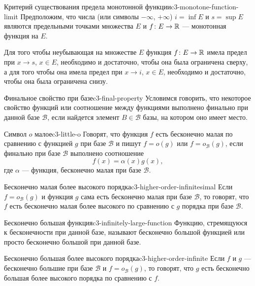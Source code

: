 \begin{theorem}{Критерий существования предела монотонной функции}{c3-monotone-function-limit}
  Предположим, что числа (или символы $-\infty$, $+\infty$)
  $i=\inf E$ и $s=\sup E$ являются предельными точками множества $E$ и
  $f\colon E\to\mathbb{R}$ — монотонная функция на $E$.

  Для того чтобы неубывающая на множестве $E$ функция $f\colon E\to\mathbb{R}$
  имела предел при $x\to s$, $x\in E$, необходимо и достаточно, чтобы она
  была ограничена сверху, а для того чтобы она имела предел при $x\to i$,
  $x\in E$, необходимо и достаточно, чтобы она была ограничена снизу.
\end{theorem}

\begin{definition}{Финальное свойство при базе}{c3-final-property}
  Условимся говорить, что некоторое свойство функций или соотношение между
  функциями выполнено финально при данной базе $\mathcal B$, если найдется
  элемент $B\in\mathcal B$ базы, на котором оно имеет место.
\end{definition}

\begin{definition}{Символ $o$ малое}{c3-little-o}
  Говорят, что функция $f$ есть бесконечно малая по сравнению с функцией
  $g$ при базе $\mathcal B$ и пишут $f=o(g)$ или
  $f=o_{\mathcal B}(g)$, если финально при базе $\mathcal B$ выполнено
  соотношение
  \[
    f(x)=\alpha(x)g(x),
  \]
  где $\alpha$ — функция, бесконечно малая при базе $\mathcal B$.
\end{definition}

\begin{definition}{Бесконечно малая более высокого порядка}{c3-higher-order-infinitesimal}
  Если $f=o_{\mathcal B}(g)$ и функция $g$ сама есть бесконечно малая при
  базе $\mathcal B$, то говорят, что $f$ есть бесконечно малая более высокого
  по сравнению с $g$ порядка при базе $\mathcal B$.
\end{definition}

\begin{definition}{Бесконечно большая функция}{c3-infinitely-large-function}
  Функцию, стремящуюся к бесконечности при данной базе, называют бесконечно
  большой функцией или просто бесконечно большой при данной базе.
\end{definition}

\begin{definition}{Бесконечно большая более высокого порядка}{c3-higher-order-infinite}
  Если $f$ и $g$ — бесконечно большие при базе $\mathcal B$ и
  $f=o_{\mathcal B}(g)$, то говорят, что $g$ есть бесконечно большая более
  высокого порядка по сравнению с $f$.
\end{definition}

